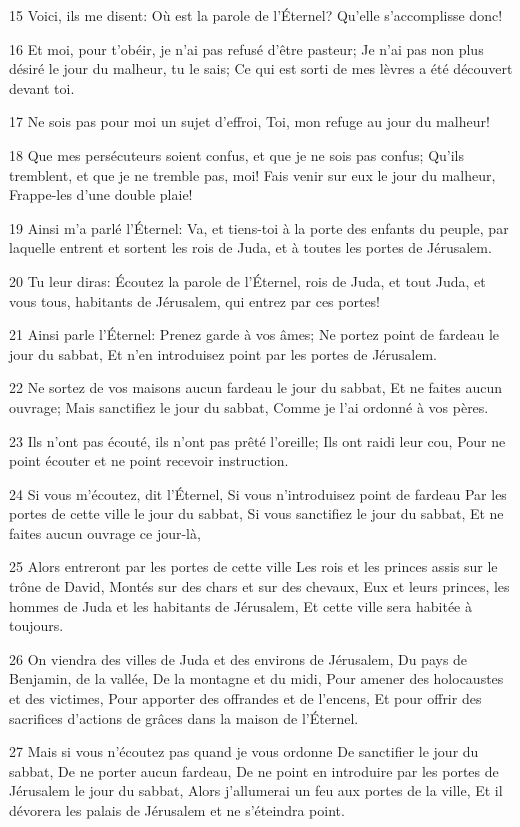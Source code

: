 \par 15 Voici, ils me disent: Où est la parole de l'Éternel? Qu'elle s'accomplisse donc!
\par 16 Et moi, pour t'obéir, je n'ai pas refusé d'être pasteur; Je n'ai pas non plus désiré le jour du malheur, tu le sais; Ce qui est sorti de mes lèvres a été découvert devant toi.
\par 17 Ne sois pas pour moi un sujet d'effroi, Toi, mon refuge au jour du malheur!
\par 18 Que mes persécuteurs soient confus, et que je ne sois pas confus; Qu'ils tremblent, et que je ne tremble pas, moi! Fais venir sur eux le jour du malheur, Frappe-les d'une double plaie!
\par 19 Ainsi m'a parlé l'Éternel: Va, et tiens-toi à la porte des enfants du peuple, par laquelle entrent et sortent les rois de Juda, et à toutes les portes de Jérusalem.
\par 20 Tu leur diras: Écoutez la parole de l'Éternel, rois de Juda, et tout Juda, et vous tous, habitants de Jérusalem, qui entrez par ces portes!
\par 21 Ainsi parle l'Éternel: Prenez garde à vos âmes; Ne portez point de fardeau le jour du sabbat, Et n'en introduisez point par les portes de Jérusalem.
\par 22 Ne sortez de vos maisons aucun fardeau le jour du sabbat, Et ne faites aucun ouvrage; Mais sanctifiez le jour du sabbat, Comme je l'ai ordonné à vos pères.
\par 23 Ils n'ont pas écouté, ils n'ont pas prêté l'oreille; Ils ont raidi leur cou, Pour ne point écouter et ne point recevoir instruction.
\par 24 Si vous m'écoutez, dit l'Éternel, Si vous n'introduisez point de fardeau Par les portes de cette ville le jour du sabbat, Si vous sanctifiez le jour du sabbat, Et ne faites aucun ouvrage ce jour-là,
\par 25 Alors entreront par les portes de cette ville Les rois et les princes assis sur le trône de David, Montés sur des chars et sur des chevaux, Eux et leurs princes, les hommes de Juda et les habitants de Jérusalem, Et cette ville sera habitée à toujours.
\par 26 On viendra des villes de Juda et des environs de Jérusalem, Du pays de Benjamin, de la vallée, De la montagne et du midi, Pour amener des holocaustes et des victimes, Pour apporter des offrandes et de l'encens, Et pour offrir des sacrifices d'actions de grâces dans la maison de l'Éternel.
\par 27 Mais si vous n'écoutez pas quand je vous ordonne De sanctifier le jour du sabbat, De ne porter aucun fardeau, De ne point en introduire par les portes de Jérusalem le jour du sabbat, Alors j'allumerai un feu aux portes de la ville, Et il dévorera les palais de Jérusalem et ne s'éteindra point.

